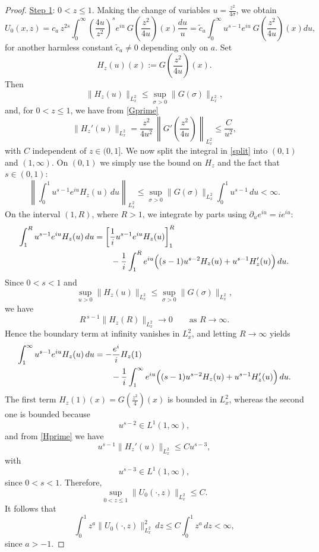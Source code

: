 \documentclass[11pt,letter]{amsart}
\numberwithin{equation}{section}
\numberwithin{equation}{section}
\begin{document}
\begin{proof}
\medskip
\noindent \underline{Step 1}: $0<z\le 1$.
Making the change of variables
$u=\frac{z^2}{4\sigma}$,
we obtain
\begin{equation}\label{split}
U_0(x,z)
=
c_a\,z^{2s} \int_0^\infty \left(\frac{4u}{z^2}\right)^s e^{iu}\  
G\left(\frac{z^2}{4u}\right)(x) \frac{du}{u} = \tilde c_a \int_0^\infty u^{s-1} e^{iu}\ G\left(\frac{z^2}{4u}\right)(x) du,
\end{equation}
for another harmless constant $\widetilde c_a\neq 0$ depending only on $a$.
Set
\[
H_z(u)(x):=G\!\left(\frac{z^2}{4u}\right)(x).
\]
Then
\[
\|H_z(u)\|_{L^2_x}\le \sup_{\sigma>0}\|G(\sigma)\|_{L^2_x},
\]
and, for $0<z\le 1$, we have from \eqref{Gprime}
\begin{equation}\label{Hprime}
\|H_z'(u)\|_{L^2_x}
=
\frac{z^2}{4u^2}\,
\left\|G'\!\left(\frac{z^2}{4u}\right)\right\|_{L^2_x}
\le \frac{C}{u^2},
\end{equation}
with $C$ independent of $z\in(0,1]$.
We now split the integral in \eqref{split} into $(0,1)$ and $(1,\infty)$.
On $(0,1)$ we simply use the bound on $H_z$ and the fact that $s\in(0,1)$:
\[
\left\|\int_0^1 u^{s-1}e^{iu}H_z(u)\,du\right\|_{L^2_x}
\le
\sup_{\sigma>0}\|G(\sigma)\|_{L^2_x}\int_0^1 u^{s-1}\,du
<\infty.
\]
On the interval $(1,R)$, where $R>1$, we integrate by parts using
$\partial_u e^{iu}=ie^{iu}$:
\[
\begin{aligned}
\int_1^R u^{s-1}e^{iu}H_z(u)\,du
&=
\left[\frac{1}{i}u^{s-1}e^{iu}H_z(u)\right]_1^R  \\
&\qquad
-\frac1i
\int_1^R
e^{iu}
\Bigl((s-1)u^{s-2}H_z(u)
+
u^{s-1}H_z'(u)
\Bigr)\,du .
\end{aligned}
\]
Since $0<s<1$ and
\[
\sup_{u>0}\|H_z(u)\|_{L^2_x}
\le
\sup_{\sigma>0}\|G(\sigma)\|_{L^2_x},
\]
we have
\[
R^{\,s-1}\|H_z(R)\|_{L^2_x}
\longrightarrow0
\qquad\text{as }R\to\infty.
\]
Hence the boundary term at infinity vanishes in $L^2_x$, and letting
$R\to\infty$ yields
\[
\begin{aligned}
\int_1^\infty u^{s-1}e^{iu}H_z(u)\,du
&=
-\frac{e^{i}}{i}H_z(1)
\\
&\qquad
-\frac1i
\int_1^\infty
e^{iu}
\Bigl((s-1)u^{s-2}H_z(u)
+
u^{s-1}H_z'(u)
\Bigr)\,du .
\end{aligned}
\]
The first term $H_z(1)(x) = G\!\left(\frac{z^2}{4}\right)(x)$ is bounded in $L^2_x$, whereas the second one is bounded
because
\[
u^{s-2}\in L^1(1,\infty),
\]
and from \eqref{Hprime} we have
\[
u^{s-1}\|H_z'(u)\|_{L^2_x}
\le
Cu^{s-3},
\]
with
\[
u^{s-3}\in L^1(1,\infty),
\]
since $0<s<1$.
Therefore,
\[
\sup_{0<z\le 1}\|U_0(\cdot,z)\|_{L^2_x}\le C.
\]
It follows that
\[
\int_0^1 z^a\|U_0(\cdot,z)\|_{L^2_x}^2\,dz
\le
C\int_0^1 z^a\,dz<\infty,
\]
since $a>-1$.


\end{proof}
\end{document}
